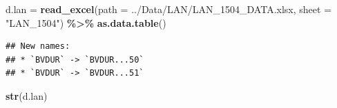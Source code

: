 \documentclass[
]{book}
\newenvironment{Shaded}{\begin{snugshade}}{\end{snugshade}}
\newcommand{\AttributeTok}[1]{\textcolor[rgb]{0.13,0.29,0.53}{#1}}
\newcommand{\FunctionTok}[1]{\textcolor[rgb]{0.13,0.29,0.53}{\textbf{#1}}}
\newcommand{\NormalTok}[1]{#1}
\newcommand{\OtherTok}[1]{\textcolor[rgb]{0.56,0.35,0.01}{#1}}
\newcommand{\SpecialCharTok}[1]{\textcolor[rgb]{0.81,0.36,0.00}{\textbf{#1}}}
\newcommand{\StringTok}[1]{\textcolor[rgb]{0.31,0.60,0.02}{#1}}
\begin{document}
\begin{Shaded}
\begin{Highlighting}[]
\NormalTok{d.lan }\OtherTok{=}  \FunctionTok{read\_excel}\NormalTok{(}\AttributeTok{path =} \StringTok{\textquotesingle{}../Data/LAN/LAN\_1504\_DATA.xlsx\textquotesingle{}}\NormalTok{,}
                   \AttributeTok{sheet =} \StringTok{"LAN\_1504"}\NormalTok{) }\SpecialCharTok{\%\textgreater{}\%} 
  \FunctionTok{as.data.table}\NormalTok{()}
\end{Highlighting}
\end{Shaded}

\begin{verbatim}
## New names:
## * `BVDUR` -> `BVDUR...50`
## * `BVDUR` -> `BVDUR...51`
\end{verbatim}

\begin{Shaded}
\begin{Highlighting}[]
\FunctionTok{str}\NormalTok{(d.lan)}
\end{Highlighting}
\end{Shaded}
\end{document}
